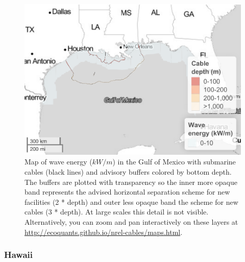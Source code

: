 \documentclass[]{article}
\begin{document}
\begin{figure}
\centering
\includegraphics{report_files/figure-latex/mapWaveGulfofMexico-1.pdf}
\caption{\label{fig:mapWaveGulfofMexico}Map of wave energy (\(kW/m\)) in the
Gulf of Mexico with submarine cables (black lines) and advisory buffers
colored by bottom depth. The buffers are plotted with transparency so
the inner more opaque band represents the advised horizontal separation
scheme for new facilities (2 * depth) and outer less opaque band the
scheme for new cables (3 * depth). At large scales this detail is not
visible. Alternatively, you can zoom and pan interactively on these
layers at \url{http://ecoquants.github.io/nrel-cables/maps.html}.}
\end{figure}

\hypertarget{hawaii}{%
\subsubsection{Hawaii}\label{hawaii}}
\end{document}
